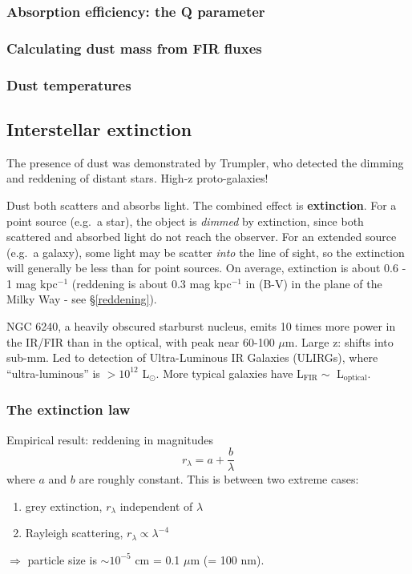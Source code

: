 \documentclass[12pt]{article}
\newcommand{\mar}[1]{\hspace{0pt}\marginpar{-\textcolor{black}{#1}-}}
\newcommand{\mynotes}[1]{\textcolor{mygreen}{#1}}
\begin{document}
\subsubsection{Absorption efficiency: the Q parameter}
\subsubsection{Calculating dust mass from FIR fluxes}
\subsubsection{Dust temperatures}

\subsection{Interstellar extinction}
\mar{116}The presence of dust was demonstrated by Trumpler, who detected the
dimming and reddening of distant stars. \mynotes{High-z proto-galaxies!}

Dust both scatters and absorbs light. The combined effect is
\textbf{extinction}.
For a point source (e.g.\ a star), the object is \emph{dimmed}
by extinction, since both scattered and absorbed light do not reach the
observer. For an extended source (e.g.\ a galaxy), some light may be scatter
\emph{into} the line of sight, so the extinction will generally be less than
for point sources.
On average, extinction is about 0.6 - 1 mag kpc$^{-1}$
(reddening is about 0.3 mag kpc$^{-1}$ in (B-V) in the plane of the
Milky Way - see \S{}\ref{reddening}).

\mynotes{NGC 6240, a heavily obscured starburst nucleus, emits 10 times more
power in the IR/FIR than in the optical, with peak near 60-100 $\mu$m.
Large z: shifts into sub-mm. Led to detection of Ultra-Luminous
IR Galaxies (ULIRGs), where ``ultra-luminous'' is $> 10^{12}$ L$_{\odot}$.
More typical galaxies have L$_{\mathrm{FIR}} \sim$ L$_{\mathrm{optical}}$.}

\subsubsection{The extinction law}
\mar{117}Empirical result: reddening in magnitudes
\[
    r_{\lambda} = a + \frac{b}{\lambda}
    \]
where $a$ and $b$ are roughly constant. This is between two extreme cases:
\begin{enumerate}
    \item grey extinction, $r_{\lambda}$ independent of $\lambda$
    \item Rayleigh scattering, $r_{\lambda} \propto \lambda^{-4}$
\end{enumerate}
$\Rightarrow$ particle size is $\sim 10^{-5}$ cm = 0.1 $\mu$m
\mynotes{(= 100 nm)}.
\end{document}
